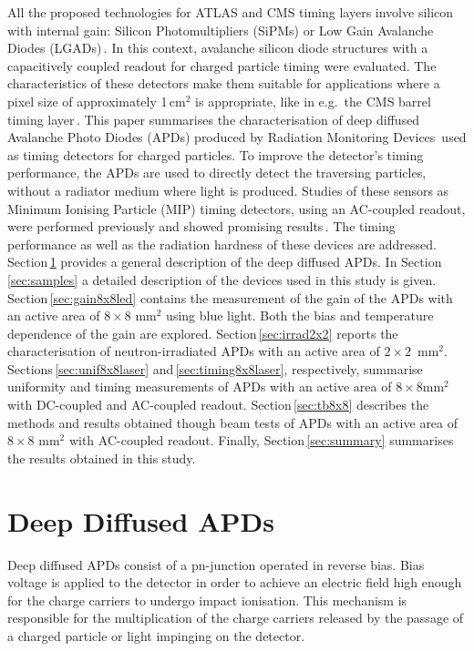 \documentclass[review,number,sort&compress]{elsarticle}
\begin{document}
All the proposed technologies for ATLAS and CMS timing layers involve silicon with internal gain: Silicon Photomultipliers (SiPMs) or Low Gain Avalanche Diodes (LGADs)\,\cite{cmsMIPtiming,atlasMIPtiming}.
In this context, avalanche silicon diode structures with a capacitively coupled readout for charged particle timing were evaluated.
The characteristics of these detectors make them suitable for applications where a pixel size of approximately 1\,cm$^{2}$ is appropriate, like in e.g.\ the CMS barrel timing layer\,\cite{cmsMIPtiming}.
This paper summarises the characterisation of deep diffused Avalanche Photo Diodes (APDs) produced by Radiation Monitoring Devices\,\cite{rmdAddress} used as timing detectors for charged particles.
To improve the detector's timing performance, the APDs are used to directly detect the traversing particles, without a radiator medium where light is produced.
Studies of these sensors as Minimum Ionising Particle (MIP) timing detectors, using an AC-coupled readout, were performed previously and showed promising results\,\cite{white2014}.
The timing performance as well as the radiation hardness of these devices are addressed.
Section\,\ref{sec:ddApds} provides a general description of the deep diffused APDs.
In Section\,\ref{sec:samples} a detailed description of the devices used in this study is given.
Section\,\ref{sec:gain8x8led} contains the measurement of the gain of the APDs with an active area of $8 \times 8$ mm$^2$ using blue light. Both the bias and temperature dependence of the gain are explored.
Section\,\ref{sec:irrad2x2} reports the characterisation of neutron-irradiated APDs with an active area of $2 \times 2$~mm$^2$.
Sections\,\ref{sec:unif8x8laser} and\,\ref{sec:timing8x8laser}, respectively, summarise uniformity and timing measurements of APDs with an active area of $8 \times 8$mm$^2$ with DC-coupled and AC-coupled readout.
Section\,\ref{sec:tb8x8} describes the methods and results obtained though beam tests of APDs with an active area of $8 \times 8$ mm$^2$ with AC-coupled readout.
Finally, Section\,\ref{sec:summary} summarises the results obtained in this study.


\section{Deep Diffused APDs}
\label{sec:ddApds}

Deep diffused APDs consist of a pn-junction operated in reverse bias.
Bias voltage is applied to the detector in order to achieve an electric field high enough for the charge carriers to undergo impact ionisation.
This mechanism is responsible for the multiplication of the charge carriers released by the passage of a charged particle or light impinging on the detector.
\end{document}

